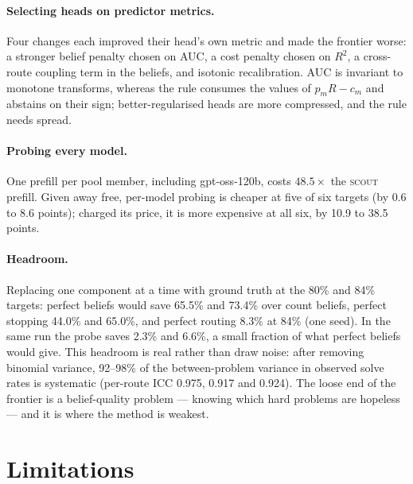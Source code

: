 \documentclass[10pt]{article} %
\newcommand{\scout}{\textsc{scout}\xspace}
\begin{document}
\paragraph{Selecting heads on predictor metrics.}
Four changes each improved their head's own metric and made the frontier worse: a stronger
belief penalty chosen on AUC, a cost penalty chosen on $R^2$, a cross-route coupling term in the
beliefs, and isotonic recalibration.  AUC is invariant to monotone transforms, whereas the rule
consumes the values of $p_mR-c_m$ and abstains on their sign; better-regularised heads are more
compressed, and the rule needs spread.

\paragraph{Probing every model.}
One prefill per pool member, including gpt-oss-120b, costs $48.5\times$ the \scout prefill.
Given away free, per-model probing is cheaper at five of six targets (by 0.6 to 8.6 points);
charged its price, it is more expensive at all six, by 10.9 to 38.5 points.

\paragraph{Headroom.}
Replacing one component at a time with ground truth at the 80\% and 84\% targets: perfect
beliefs would save 65.5\% and 73.4\% over count beliefs, perfect stopping 44.0\% and 65.0\%, and
perfect routing 8.3\% at 84\% (one seed).  In the same run the probe saves 2.3\% and 6.6\%, a
small fraction of what perfect beliefs would give.  This headroom is real rather than draw noise: after removing binomial
variance, 92--98\% of the between-problem variance in observed solve rates is systematic (per-route
ICC 0.975, 0.917 and 0.924).  The loose end of the frontier is a belief-quality problem --- knowing
which hard problems are hopeless --- and it is where the method is weakest.

\section{Limitations}
\label{sec:limitations}
\end{document}

